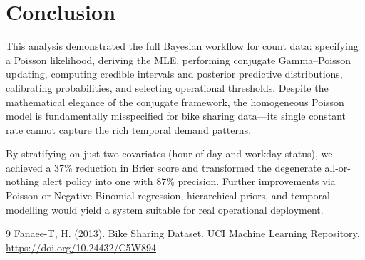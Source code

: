 \documentclass[12pt]{article}
\begin{document}
\section{Conclusion}

This analysis demonstrated the full Bayesian workflow for count data:
specifying a Poisson likelihood, deriving the MLE, performing
conjugate Gamma--Poisson updating, computing credible intervals and
posterior predictive distributions, calibrating probabilities, and
selecting operational thresholds.  Despite the mathematical elegance
of the conjugate framework, the homogeneous Poisson model is
fundamentally misspecified for bike sharing data---its single
constant rate cannot capture the rich temporal demand patterns.

By stratifying on just two covariates (hour-of-day and workday
status), we achieved a 37\% reduction in Brier score and transformed
the degenerate all-or-nothing alert policy into one with 87\%
precision.  Further improvements via Poisson or Negative Binomial
regression, hierarchical priors, and temporal modelling would yield
a system suitable for real operational deployment.


\begin{thebibliography}{9}
Fanaee-T, H. (2013).
\newblock Bike Sharing Dataset.
\newblock UCI Machine Learning Repository.
\newblock \url{https://doi.org/10.24432/C5W894}
\end{thebibliography}
\end{document}
